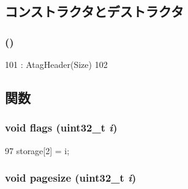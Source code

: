 \subsection{コンストラクタとデストラクタ}
\hypertarget{classAtagCore_aa17521239ade4990532d2ff6da15f5af}{
\subsubsection[{AtagCore}]{ ()}}
\label{classAtagCore_aa17521239ade4990532d2ff6da15f5af}



\begin{DoxyCode}
101         : AtagHeader(Size)
102     {}
\end{DoxyCode}


\subsection{関数}
\hypertarget{classAtagCore_a9194d847dbae195ee96ef3fb62cac560}{
\subsubsection[{flags}]{\setlength{\rightskip}{0pt plus 5cm}void flags ({\bf uint32\_\-t} {\em i})}}
\label{classAtagCore_a9194d847dbae195ee96ef3fb62cac560}



\begin{DoxyCode}
97 { storage[2] = i; }
\end{DoxyCode}
\hypertarget{classAtagCore_a0514c636f3ed15e3c9d0d975271b516b}{
\subsubsection[{pagesize}]{\setlength{\rightskip}{0pt plus 5cm}void pagesize ({\bf uint32\_\-t} {\em i})}}
\label{classAtagCore_a0514c636f3ed15e3c9d0d975271b516b}



